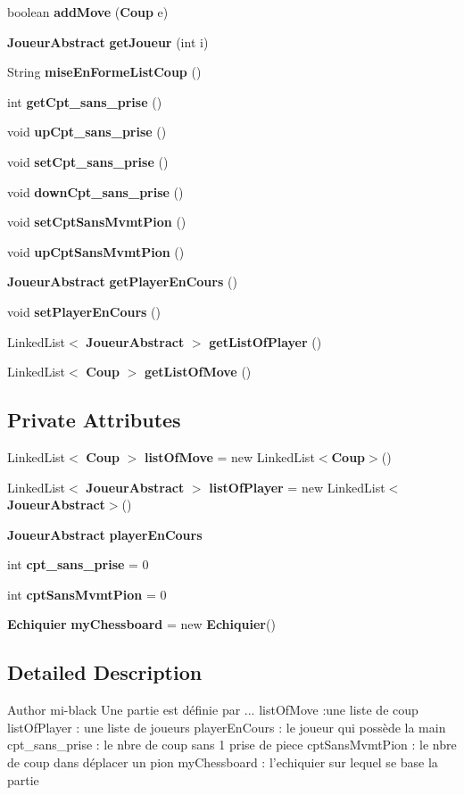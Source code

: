 \begin{DoxyCompactItemize}
boolean {\bf add\-Move} ({\bf Coup} e)
\item 
{\bf Joueur\-Abstract} {\bf get\-Joueur} (int i)
\item 
String {\bf mise\-En\-Forme\-List\-Coup} ()
\item 
int {\bf get\-Cpt\-\_\-sans\-\_\-prise} ()
\item 
void {\bf up\-Cpt\-\_\-sans\-\_\-prise} ()
\item 
void {\bf set\-Cpt\-\_\-sans\-\_\-prise} ()
\item 
void {\bf down\-Cpt\-\_\-sans\-\_\-prise} ()
\item 
void {\bf set\-Cpt\-Sans\-Mvmt\-Pion} ()
\item 
void {\bf up\-Cpt\-Sans\-Mvmt\-Pion} ()
\item 
{\bf Joueur\-Abstract} {\bf get\-Player\-En\-Cours} ()
\item 
void {\bf set\-Player\-En\-Cours} ()
\item 
Linked\-List$<$ {\bf Joueur\-Abstract} $>$ {\bf get\-List\-Of\-Player} ()
\item 
Linked\-List$<$ {\bf Coup} $>$ {\bf get\-List\-Of\-Move} ()
\end{DoxyCompactItemize}
\subsection*{Private Attributes}
\begin{DoxyCompactItemize}
\item 
Linked\-List$<$ {\bf Coup} $>$ {\bf list\-Of\-Move} = new Linked\-List$<${\bf Coup}$>$()
\item 
Linked\-List$<$ {\bf Joueur\-Abstract} $>$ {\bf list\-Of\-Player} = new Linked\-List$<${\bf Joueur\-Abstract}$>$()
\item 
{\bf Joueur\-Abstract} {\bf player\-En\-Cours}
\item 
int {\bf cpt\-\_\-sans\-\_\-prise} = 0
\item 
int {\bf cpt\-Sans\-Mvmt\-Pion} = 0
\item 
{\bf Echiquier} {\bf my\-Chessboard} = new {\bf Echiquier}()
\end{DoxyCompactItemize}


\subsection{Detailed Description}
\begin{DoxyAuthor}{Author}
mi-\/black Une partie est définie par ... list\-Of\-Move \-:une liste de coup list\-Of\-Player \-: une liste de joueurs player\-En\-Cours \-: le joueur qui possède la main cpt\-\_\-sans\-\_\-prise \-: le nbre de coup sans 1 prise de piece cpt\-Sans\-Mvmt\-Pion \-: le nbre de coup dans déplacer un pion my\-Chessboard \-: l'echiquier sur lequel se base la partie 
\end{DoxyAuthor}



